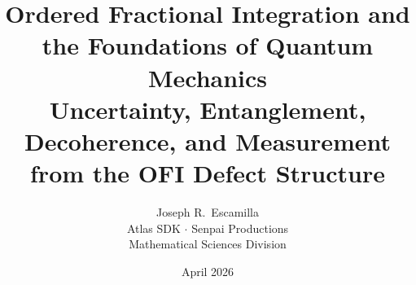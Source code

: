 \documentclass[12pt]{article}
\theoremstyle{definition}
\begin{document}

\title{%
  \textbf{Ordered Fractional Integration and the Foundations%
          of Quantum Mechanics}\\[0.5em]
  \large Uncertainty, Entanglement, Decoherence, and Measurement%
         from the OFI Defect Structure%
}

\author{%
  Joseph R.\ Escamilla\\[0.3em]
  \small Atlas SDK $\cdot$ Senpai Productions\\
  \small Mathematical Sciences Division
}

\date{April 2026}

\maketitle
\end{document}
